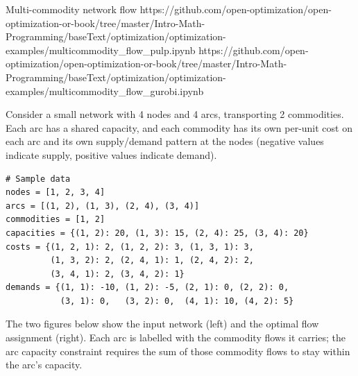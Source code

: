 \begin{examplewithallcode}{Multi-commodity network flow}
{}
{https://github.com/open-optimization/open-optimization-or-book/tree/master/Intro-Math-Programming/baseText/optimization/optimization-examples/multicommodity_flow_pulp.ipynb}
{https://github.com/open-optimization/open-optimization-or-book/tree/master/Intro-Math-Programming/baseText/optimization/optimization-examples/multicommodity_flow_gurobi.ipynb}
\label{ex:multicommodity-network-flow}

Consider a small network with 4 nodes and 4 arcs, transporting 2 commodities. Each arc has a shared capacity, and each commodity has its own per-unit cost on each arc and its own supply/demand pattern at the nodes (negative values indicate supply, positive values indicate demand).
\begin{verbatim}
# Sample data
nodes = [1, 2, 3, 4]
arcs = [(1, 2), (1, 3), (2, 4), (3, 4)]
commodities = [1, 2]
capacities = {(1, 2): 20, (1, 3): 15, (2, 4): 25, (3, 4): 20}
costs = {(1, 2, 1): 2, (1, 2, 2): 3, (1, 3, 1): 3,
         (1, 3, 2): 2, (2, 4, 1): 1, (2, 4, 2): 2,
         (3, 4, 1): 2, (3, 4, 2): 1}
demands = {(1, 1): -10, (1, 2): -5, (2, 1): 0, (2, 2): 0,
           (3, 1): 0,   (3, 2): 0,  (4, 1): 10, (4, 2): 5}
\end{verbatim}

The two figures below show the input network (left) and the optimal flow assignment (right). Each arc is labelled with the commodity flows it carries; the arc capacity constraint requires the sum of those commodity flows to stay within the arc's capacity.

\begin{center}
\end{center}
\end{examplewithallcode}
